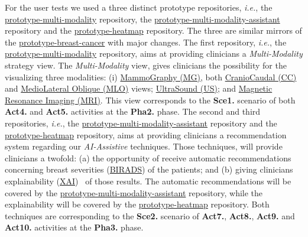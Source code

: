 For the user tests we used a three distinct prototype repositories, \textit{i.e.}, the \hyperlink{https://github.com/MIMBCD-UI/prototype-multi-modality}{prototype-multi-modality} repository, the \hyperlink{https://github.com/mida-project/prototype-multi-modality-assistant}{prototype-multi-modality-assistant} repository and the \hyperlink{https://github.com/mida-project/prototype-heatmap}{prototype-heatmap} repository. The three are similar mirrors of the \hyperlink{https://github.com/MIMBCD-UI/prototype-breast-cancer}{prototype-breast-cancer} with major changes. The first repository, \textit{i.e.}, the \hyperlink{https://github.com/MIMBCD-UI/prototype-multi-modality}{prototype-multi-modality} repository, aims at providing clinicians a \textit{Multi-Modality} strategy view. The \textit{Multi-Modality} view, gives clinicians the possibility for the visualizing three modalities: (i) \hyperlink{https://medical-dictionary.thefreedictionary.com/mammography}{MammoGraphy (MG)}, both \hyperlink{https://medical-dictionary.thefreedictionary.com/craniocaudal}{CranioCaudal (CC)} and \hyperlink{https://www.thefreedictionary.com/mediolateral}{MedioLateral Oblique (MLO)} views; \hyperlink{https://www.thefreedictionary.com/UltraSound}{UltraSound (US)}; and \hyperlink{https://www.thefreedictionary.com/Magnetic+Resonance+Imaging}{Magnetic Resonance Imaging (MRI)}. This view corresponds to the \textbf{Sce1.} scenario of both \textbf{Act4.} and \textbf{Act5.} activities at the \textbf{Pha2.} phase. The second and third repositories, \textit{i.e.}, the \hyperlink{https://github.com/mida-project/prototype-multi-modality-assistant}{prototype-multi-modality-assistant} repository and the \hyperlink{https://github.com/mida-project/prototype-heatmap}{prototype-heatmap} repository, aims at providing clinicians a recommendation system regarding our \textit{AI-Assistive} techniques. Those techniques, will provide clinicians a twofold: (a) the opportunity of receive automatic recommendations concerning breast severities (\hyperlink{https://en.wikipedia.org/wiki/BI-RADS}{BIRADS}) of the patients; and (b) giving clinicians explainability (\hyperlink{https://www.darpa.mil/program/explainable-artificial-intelligence}{XAI})~\cite{gunning2017explainable, holzinger2017we} of those results. The automatic recommendations will be covered by the \hyperlink{https://github.com/mida-project/prototype-multi-modality-assistant}{prototype-multi-modality-assistant} repository, while the explainability will be covered by the \hyperlink{https://github.com/mida-project/prototype-heatmap}{prototype-heatmap} repository. Both techniques are corresponding to the \textbf{Sce2.} scenario of \textbf{Act7.}, \textbf{Act8.}, \textbf{Act9.} and \textbf{Act10.} activities at the \textbf{Pha3.} phase.